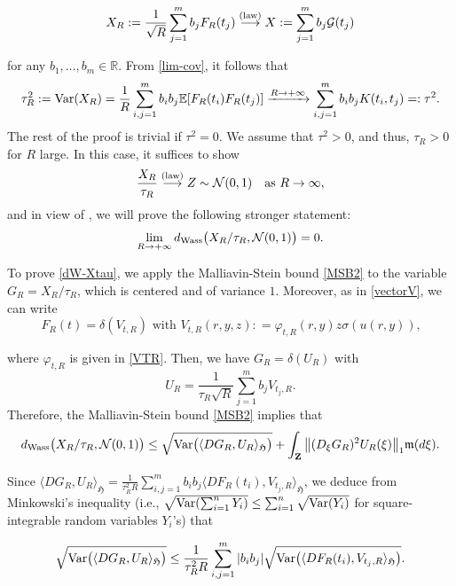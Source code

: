 \documentclass[letterpaper, 11pt,  reqno]{amsart}
\newcommand{\noi}{\noindent}
\newcommand{\bE}{\mathbb{E}}
\newcommand{\bR}{\mathbb{R}}
\newcommand{\cG}{\mathcal{G}}
\newcommand{\cN}{\mathcal{N}}
\newcommand{\s}{\sigma}
\newcommand{\Var}{\textup{Var}}
\newcommand{\fm}{\mathfrak{m}}
\newcommand{\fH}{\mathfrak{H}}
\numberwithin{equation}{section}
\numberwithin{theorem}{section}
\begin{document}
\noi
\begin{align}  \notag  %
X_R:=\frac{1}{\sqrt{R}}\sum_{j=1}^{m}b_j F_R(t_j) 
\stackrel{{\rm (law)}}{\longrightarrow} X:=\sum_{j=1}^{m}b_j \cG(t_j)
\end{align}

\noi
for any $b_1,\ldots,b_m \in \bR$. From  \eqref{lim-cov}, 
it follows that 
\[
\tau_R^2:={\rm Var}(X_R)
=\frac{1}{R}\sum_{i,j=1}^{m}b_i b_j \bE[F_R(t_i)F_R(t_j)] \xrightarrow{R\to+\infty}
 \sum_{i,j=1}^{m}b_i b_j K(t_i,t_j)=:\tau^2.
\]
The rest of the proof is trivial if $\tau^2=0$. We assume that $\tau^2 >0$,
and thus, $\tau_R>0$ for $R$ large. In this case, it suffices to show 
\[
\frac{X_R}{\tau_R} \stackrel{{\rm (law)}}{\longrightarrow} 
Z \sim \mathcal{N}(0,1) \quad \mbox{as $R \to \infty$},
\]
and in view of \cite[Proposition C.3.1]{blue}, 
we will prove the following stronger statement:
\begin{equation}
\label{dW-Xtau}
\lim_{R\to+\infty} d_{\rm Wass}\big( X_R/\tau_R,  \cN(0,1) \big) = 0. 
\end{equation}

\noi
To prove \eqref{dW-Xtau}, we apply the Malliavin-Stein bound \eqref{MSB2} to the variable 
$G_R=X_{R}/\tau_R$, which is centered and of variance $1$. 
Moreover, as in \eqref{vectorV}, we can write 
\[
\text{$F_R(t)=\delta(V_{t,R})$ with $V_{t,R}(r, y, z): =  \varphi_{t, R}(r, y) z \s( u(r, y))$,}
\]

\noi
where $\varphi_{t,R}$ is given in \eqref{VTR}.
Then, we have  $G_R=\delta(U_R)$ with
\[
U_R=\frac{1}{\tau_R \sqrt{R}}\sum_{j=1}^{m}b_j V_{t_j,R}.
\]
Therefore, the  Malliavin-Stein bound \eqref{MSB2} implies that
\begin{align}\label{FCLT1}
d_{\rm Wass}\big( X_R/\tau_R,  \cN(0,1) \big) 
 \leq \sqrt{{\rm Var}\big(\langle DG_R, U_R \rangle_{\fH}\big)}
 +  \int_{\mathbf{Z}} \big\| (D_{\xi} G_R)^2  U_R(\xi) \big\|_1  \fm(d\xi).
\end{align}

\noi
Since  
$ \langle DG_R, U_R \rangle_{\fH}=\frac{1}{\tau_R^2 R}\sum_{i,j=1}^{m}b_i b_j \langle 
DF_R(t_i), V_{t_j,R} \rangle_{\fH}
$,
we deduce from Minkowski's inequality (i.e., 
$\sqrt{ \Var(\sum_{i=1}^{n}Y_i )}\leq \sum_{i=1}^{n} \sqrt{{\rm Var}(Y_i)}$
for square-integrable random variables $Y_i$'s)
  that 
 
 \noi
 \begin{align} \notag
\sqrt{{\rm Var}\big(\langle DG_R, U_R \rangle_{\fH}\big)}
\leq \frac{1}{\tau_R^2 R} \sum_{i,j=1}^{m}|b_i b_j| \sqrt{{\rm Var}\big( \langle 
DF_R(t_i), V_{t_j,R} \rangle_{\fH} \big)}.
\end{align}
\end{document}
